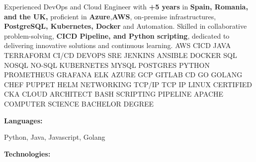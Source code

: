 \documentclass[9pt]{developercv} %
\begin{document}
\begin{minipage}[t]{0.46\textwidth}
    \vspace{-6pt}

    {Experienced DevOps and Cloud Engineer with \textbf{+5 years} in \textbf{Spain,
            Romania, and the UK,} proficient in \textbf{Azure},\textbf{AWS}, on-premise
        infrastructures, \textbf{PostgreSQL, Kubernetes, Docker} and Automation.
        Skilled in collaborative problem-solving, \textbf{CICD
            Pipeline, and Python scripting}, dedicated to delivering
        innovative solutions and continuous learning.}
    {\color{white}\tiny AWS CICD JAVA TERRAFORM CI/CD DEVOPS SRE JENKINS ANSIBLE DOCKER SQL NOSQL NO-SQL KUBERNETES MYSQL POSTGRES PYTHON PROMETHEUS GRAFANA ELK AZURE GCP GITLAB CD GO GOLANG CHEF PUPPET HELM NETWORKING TCP/IP TCP IP LINUX CERTIFIED CKA CLOUD ARCHITECT BASH SCRIPTING PIPELINE APACHE COMPUTER SCIENCE BACHELOR DEGREE  }
\end{minipage}
\hfill %
\begin{minipage}[t]{0.465\textwidth}
    \vspace{-6pt}

    \begin{minipage}[t]{0.2\textwidth}
        \textbf{Languages:}
    \end{minipage}
    \hfill
    \begin{minipage}[t]{0.72\textwidth}
        Python, Java, Javascript, Golang
    \end{minipage}
    \vspace{4mm}

    \begin{minipage}[t]{0.2\textwidth}
        \textbf{Technologies:}
    \end{minipage}
    \hfill
    \begin{minipage}[t]{0.73\textwidth}
    \end{minipage}

\end{minipage}
\end{document}
